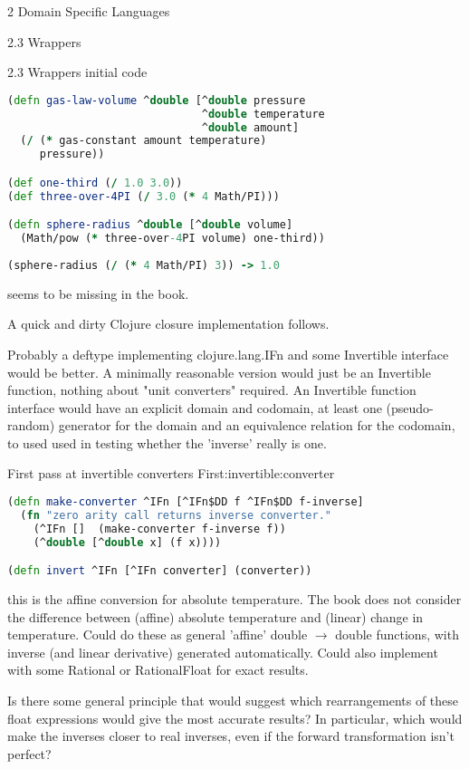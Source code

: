 \documentclass[12pt]{PalisadesLakesBook}
\begin{document}
\begin{plSection}{}
\begin{plSection}{2 Domain Specific Languages}
\begin{plSection}{2.3 Wrappers}
\begin{plSection}{2.3 Wrappers initial code}
\begin{plListing}
\begin{lstlisting}[language=clojure]
(defn gas-law-volume ^double [^double pressure 
                              ^double temperature 
                              ^double amount]
  (/ (* gas-constant amount temperature)
     pressure))

(def one-third (/ 1.0 3.0))
(def three-over-4PI (/ 3.0 (* 4 Math/PI)))

(defn sphere-radius ^double [^double volume]
  (Math/pow (* three-over-4PI volume) one-third)) 
  
(sphere-radius (/ (* 4 Math/PI) 3)) -> 1.0
\end{lstlisting}
\end{plListing}

 seems to be missing
in the book.

A quick and dirty Clojure closure
implementation follows.

\TODO Probably a {\clojureFont deftype}
implementing {\clojureFont clojure.lang.IFn}
and some {\clojureFont Invertible} interface would be better.
A minimally reasonable version would just be an 
{\clojureFont Invertible}
function, nothing about "unit converters" required.
An {\clojureFont Invertible} function interface would 
have an explicit domain and codomain, 
at least one (pseudo-random) generator for the domain and
an equivalence relation for the codomain, to used used in
testing whether the 'inverse' really is one.
 
\begin{plListing}
{First pass at invertible converters}
{First:invertible:converter}
\begin{lstlisting}[language=clojure]
(defn make-converter ^IFn [^IFn$DD f ^IFn$DD f-inverse]
  (fn "zero arity call returns inverse converter."
    (^IFn []  (make-converter f-inverse f))
    (^double [^double x] (f x))))

(defn invert ^IFn [^IFn converter] (converter))
\end{lstlisting}
\end{plListing}

\NOTE this is the affine conversion for absolute temperature.
The book does not consider the difference between (affine) 
absolute temperature and (linear) change in temperature.
Could do these as general 'affine' 
{\javaFont double} $\rightarrow$ {\javaFont double} functions,
with inverse (and linear derivative) generated automatically.
Could also implement with some {\clojureFont Rational}
 or {\clojureFont RationalFloat}
for exact results.

\TODO Is there some general principle that would suggest which
rearrangements of these float expressions would give 
the most accurate results? In particular, which would make
the inverses closer to real inverses, even if the forward
transformation isn't perfect? 


\end{plSection}
\end{plSection}
\end{plSection}
\end{plSection}
\end{document}
